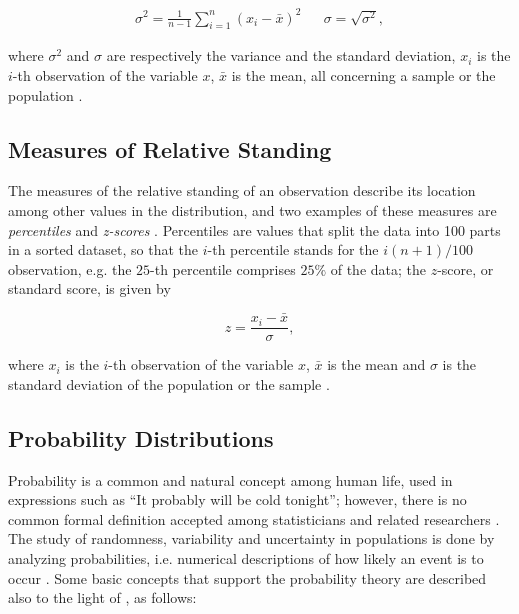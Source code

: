 \begin{align}
\label{eqn:variance_std}
\sigma^{2} = \frac{1}{n - 1} \sum_{i = 1}^{n} \left(x_{i} - \bar{x}\right)^{2}
&&
\sigma = \sqrt{\sigma^{2}},
\end{align}

\noindent where $\sigma^{2}$ and $\sigma$ are respectively the variance and the standard deviation, $x_{i}$ is the $i$-th observation of the variable $x$, $\bar{x}$ is the mean, all concerning a sample or the population \cite{zwillinger1999crc}.

\subsection{Measures of Relative Standing}

The measures of the relative standing of an observation describe its location among other values in the distribution, and two examples of these measures are \emph{percentiles} and \emph{z-scores} \cite{mendenhall2016statistics}. Percentiles are values that split the data into 100 parts in a sorted dataset, so that the $i$-th percentile stands for the $i(n + 1) / 100$ observation, e.g. the $25$-th percentile comprises $25\%$ of the data; the $z$-score, or standard score, is given by

\begin{equation}
\label{eqn:z_score}
z = \frac{x_{i} - \bar{x}}{\sigma},
\end{equation}

\noindent where $x_{i}$ is the $i$-th observation of the variable $x$, $\bar{x}$ is the mean and $\sigma$ is the standard deviation of the population or the sample \cite{zwillinger1999crc}.

\subsection{Probability Distributions}

Probability is a common and natural concept among human life, used in expressions such as ``It probably will be cold tonight''; however, there is no common formal definition accepted among statisticians and related researchers \cite{degroot2012probability}. The study of randomness, variability and uncertainty in populations is done by analyzing probabilities, i.e. numerical descriptions of how likely an event is to occur \cite{devore2011probability}. Some basic concepts that support the probability theory are described also to the light of , as follows:

